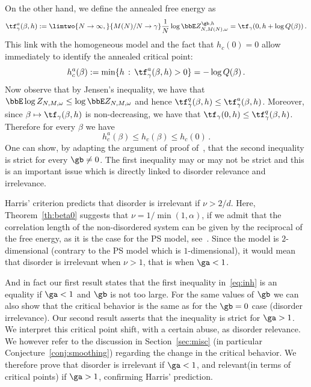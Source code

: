 On the other hand, we define the annealed free energy as
\begin{equation}
\tf_\gamma^{a}(\beta,h) := \limtwo{N\to\infty,}{M(N) / N \to \gamma} \frac{1}{N} \log \bbE Z_{N,M(N),\omega}^{\gb,h} = \tf_\gamma (0, h + \log Q(\beta))\,.
\end{equation}
This link with the homogeneous model and the fact that $h_c(0)=0$ allow immediately to identify the annealed critical point:
\begin{equation}\label{eq:hann}
h_c^{a}(\beta) := \min \lbrace h\,:\,\tf^{a}_\gamma (\beta,h) >0 \rbrace = - \log Q(\beta)\,.
\end{equation}
Now observe that by Jensen's inequality, we have that $\bbE \log Z_{N,M,\omega} \le \log \bbE Z_{N,M,\omega}$ and hence $\tf_\gamma^{q}(\beta,h) \le \tf_\gamma^{a}(\beta,h)$. Moreover, since $\beta \mapsto \tf_\gamma (\beta,h)$ is non-decreasing, we have that $\tf_\gamma (0,h) \le \tf^{q}_\gamma (\beta,h) $. Therefore for every $\beta$ we have
\begin{equation}\label{eq:inh}
h_c^{a}(\beta)\le h_c(\beta) \le h_c(0)\,.
\end{equation}
One can show, by adapting the argument of proof of~\cite[Theorem~5.2]{cf:G}, that the second inequality is strict for every $\gb \neq 0$. The first inequality may or may not be strict and this is an important issue which is directly linked to disorder relevance and irrelevance.


Harris' criterion predicts that disorder is irrelevant if $\nu>2/d$. Here, Theorem~\ref{th:beta0} suggests that $\nu=1/\min(1,\alpha)$, if we admit that the correlation length of the non-disordered system can be given by the reciprocal of the free energy, as it is the case for the PS model, see~\cite{cf:G08}. Since the model is $2$-dimensional (contrary to the PS model which is $1$-dimensional), it would mean that disorder is irrelevant when $\nu>1$, that is when $\ga<1$.



And in fact our first result states that the first inequality in~\eqref{eq:inh} is an equality if $\ga<1$ and $\gb$ is not too large. For the same values of $\gb$ we can also show that the critical behavior is the same as for the $\gb=0$ case (disorder irrelevance). Our second result asserts that the inequality is strict for $\ga>1$. We interpret this critical point shift, with a certain abuse, as disorder relevance. We however refer to the discussion in Section~\ref{sec:misc} (in particular Conjecture~\ref{conj:smoothing}) regarding the change in the critical behavior. We therefore prove that disorder is irrelevant if $\ga<1$, and relevant\linebreak(in terms of critical points) if $\ga>1$, confirming Harris' prediction.




